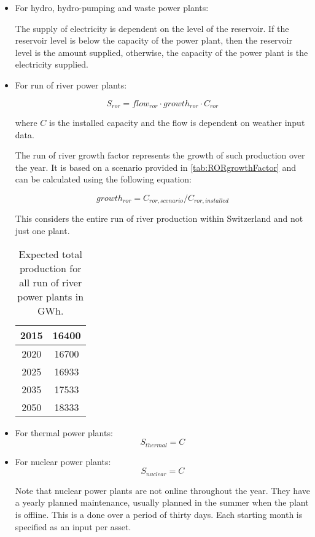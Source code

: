 \begin{itemize}
\item For hydro, hydro-pumping and waste power plants:

The supply of electricity is dependent on the level of the reservoir. If the reservoir level is below the capacity of the power plant, then the reservoir level is the amount supplied, otherwise, the capacity of the power plant is the electricity supplied.


\item For run of river power plants:

\begin{equation}
S_{ror} = flow_{ror} \cdot growth_{ror} \cdot C_{ror}
\end{equation}

where $C$ is the installed capacity and the flow is dependent on weather input data.

The run of river growth factor represents the growth of such production over the year. It is based on a scenario provided in \autoref{tab:RORgrowthFactor} and can be calculated using the following equation:

\begin{equation}
growth_{ror} = C_{ror,scenario}/C_{ror,installed}
\end{equation}

This considers the entire run of river production within Switzerland and not just one plant.

\begin{table}[h!]
\begin{center}
\begin{tabular}{ |c|c| } 
\hline
2015		& 16400 \\ \hline
2020		& 16700  \\ \hline
2025		& 16933  \\ \hline
2035		& 17533  \\ \hline
2050		& 18333 \\ 
 \hline
\end{tabular}
\end{center}
\caption{Expected total production for all run of river power plants in GWh.}
\label{tab:RORgrowthFactor}
\end{table}

\item For thermal power plants:
\begin{equation}
S_{thermal} = C
\end{equation}

\item For nuclear power plants:
\begin{equation}
S_{nuclear} = C
\end{equation}

Note that nuclear power plants are not online throughout the year. They have a yearly planned maintenance, usually planned in the summer when the plant is offline. This is a done over a period of thirty days. Each starting month is specified as an input per asset.

\end{itemize}

